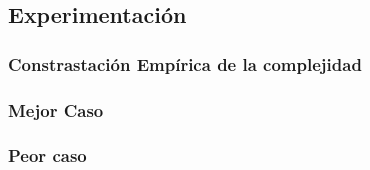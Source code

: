 \subsection{Experimentación}

\subsubsection{Constrastación Empírica de la complejidad}
\subsubsection{Mejor Caso}
\subsubsection{Peor caso}

